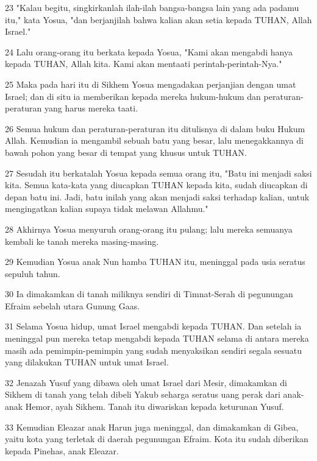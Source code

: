 \par 23 "Kalau begitu, singkirkanlah ilah-ilah bangsa-bangsa lain yang ada padamu itu," kata Yosua, "dan berjanjilah bahwa kalian akan setia kepada TUHAN, Allah Israel."
\par 24 Lalu orang-orang itu berkata kepada Yosua, "Kami akan mengabdi hanya kepada TUHAN, Allah kita. Kami akan mentaati perintah-perintah-Nya."
\par 25 Maka pada hari itu di Sikhem Yosua mengadakan perjanjian dengan umat Israel; dan di situ ia memberikan kepada mereka hukum-hukum dan peraturan-peraturan yang harus mereka taati.
\par 26 Semua hukum dan peraturan-peraturan itu ditulisnya di dalam buku Hukum Allah. Kemudian ia mengambil sebuah batu yang besar, lalu menegakkannya di bawah pohon yang besar di tempat yang khusus untuk TUHAN.
\par 27 Sesudah itu berkatalah Yosua kepada semua orang itu, "Batu ini menjadi saksi kita. Semua kata-kata yang diucapkan TUHAN kepada kita, sudah diucapkan di depan batu ini. Jadi, batu inilah yang akan menjadi saksi terhadap kalian, untuk mengingatkan kalian supaya tidak melawan Allahmu."
\par 28 Akhirnya Yosua menyuruh orang-orang itu pulang; lalu mereka semuanya kembali ke tanah mereka masing-masing.
\par 29 Kemudian Yosua anak Nun hamba TUHAN itu, meninggal pada usia seratus sepuluh tahun.
\par 30 Ia dimakamkan di tanah miliknya sendiri di Timnat-Serah di pegunungan Efraim sebelah utara Gunung Gaas.
\par 31 Selama Yosua hidup, umat Israel mengabdi kepada TUHAN. Dan setelah ia meninggal pun mereka tetap mengabdi kepada TUHAN selama di antara mereka masih ada pemimpin-pemimpin yang sudah menyaksikan sendiri segala sesuatu yang dilakukan TUHAN untuk umat Israel.
\par 32 Jenazah Yusuf yang dibawa oleh umat Israel dari Mesir, dimakamkan di Sikhem di tanah yang telah dibeli Yakub seharga seratus uang perak dari anak-anak Hemor, ayah Sikhem. Tanah itu diwariskan kepada keturunan Yusuf.
\par 33 Kemudian Eleazar anak Harun juga meninggal, dan dimakamkan di Gibea, yaitu kota yang terletak di daerah pegunungan Efraim. Kota itu sudah diberikan kepada Pinehas, anak Eleazar.


